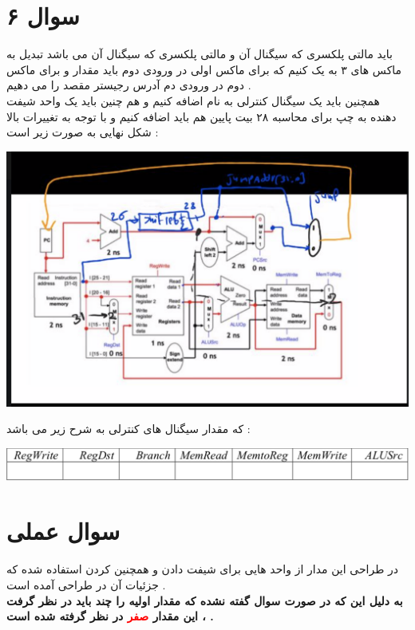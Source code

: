 \documentclass{article}
\begin{document}
\section*{سوال ۶}
باید مالتی پلکسری که سیگنال 
آن 
و مالتی پلکسری که سیگنال 
آن 
می باشد تبدیل به ماکس های ۳ به یک کنیم که برای ماکس اولی در ورودی دوم باید مقدار 
و برای ماکس دوم در ورودی دم آدرس رجیستر مقصد را می دهیم  .
\\
همچنین باید یک سیگنال کنترلی به نام 
\lr{\textcolor{red}{Jump}}
اضافه کنیم و هم چنین باید یک واحد شیفت دهنده به چپ برای محاسبه ۲۸ بیت پایین 
هم باید اضافه کنیم و با توجه به تغییرات بالا شکل نهایی به صورت زیر است  : 
 \begin{center}
	\includegraphics[width=1\textwidth]{jal6}
\end{center}
که مقدار سیگنال های کنترلی به شرح زیر می باشد :‌
 \begin{center}
	\includegraphics[width=1\textwidth]{beq}
\end{center}
\section*{سوال عملی }
در طراحی این مدار از واحد هایی برای شیفت دادن و همچنین 
کردن  استفاده شده که جزئیات آن در طراحی آمده است  . 
\\
\textbf{به دلیل این که در صورت سوال گفته نشده که مقدار اولیه 
را چند باید در نظر گرفت ، این مقدار 
\textcolor{red}{صفر}
در نظر گرفته شده است  . 
}
\end{document}
